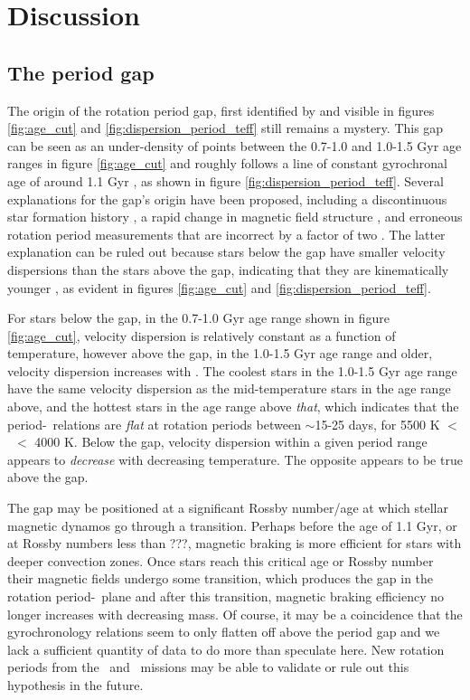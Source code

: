 \section{Discussion}
\label{sec:discussion}

\subsection{The period gap}
\label{sec:period_gap}

The origin of the rotation period gap, first identified
by \citet{mcquillan2013} and visible in figures \ref{fig:age_cut} and
\ref{fig:dispersion_period_teff} still remains a mystery.
This gap can be seen as an under-density of points between the 0.7-1.0 and
1.0-1.5 Gyr age ranges in figure \ref{fig:age_cut} and roughly follows a line
of constant gyrochronal age of around 1.1 Gyr \citep[according to the
gyrochronology relation of][]{angus2019}, as shown in figure
\ref{fig:dispersion_period_teff}.
Several explanations for the gap's origin have been proposed, including a
discontinuous star formation history \citep{mcquillan2013, davenport2017,
davenport2018}, a rapid change in magnetic field structure
\citep{reinhold2019}, and erroneous rotation period measurements that are
incorrect by a factor of two \citep{koen2018}.
The latter explanation can be ruled out because stars below the gap have
smaller velocity dispersions than the stars above the gap, indicating that
they are kinematically younger \citep{mcquillan2013, davenport2018}, as
evident in figures \ref{fig:age_cut} and \ref{fig:dispersion_period_teff}.

For stars below the gap, in the 0.7-1.0 Gyr age range shown in figure
\ref{fig:age_cut}, velocity dispersion is relatively constant as a function of
temperature, however above the gap, in the 1.0-1.5 Gyr age range and older,
velocity dispersion increases with \teff.
The coolest stars in the 1.0-1.5 Gyr age range have the same velocity
dispersion as the mid-temperature stars in the age range above, and the
hottest stars in the age range above {\it that}, which indicates that the
period-\teff\ relations are {\it flat} at rotation periods between $\sim$15-25
days, for 5500 K $<$ \teff\ $<$ 4000 K.
Below the gap, velocity dispersion within a given period range appears to {\it
decrease} with decreasing temperature.
The opposite appears to be true above the gap.

The gap may be positioned at a significant Rossby number/age at which stellar
magnetic dynamos go through a transition.
Perhaps before the age of 1.1 Gyr, or at Rossby numbers less than ???,
magnetic braking is more efficient for stars with deeper convection zones.
Once stars reach this critical age or Rossby number their magnetic fields
undergo some transition, which produces the gap in the rotation period-\teff\
plane and after this transition, magnetic braking efficiency no longer
increases with decreasing mass.
Of course, it may be a coincidence that the gyrochronology relations seem to
only flatten off above the period gap and we lack a sufficient quantity of
data to do more than speculate here.
New rotation periods from the \ktwo\ and \tess\ missions may be able to
validate or rule out this hypothesis in the future.


